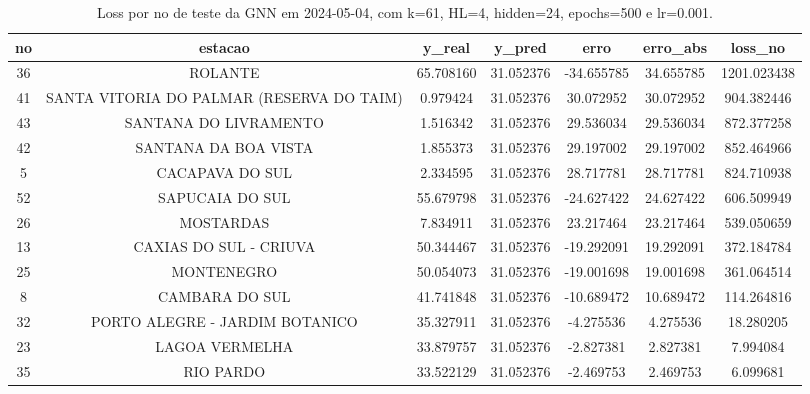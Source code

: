 \begin{table}[h]
\centering
\caption{Loss por no de teste da GNN em 2024-05-04, com k=61, HL=4, hidden=24, epochs=500 e lr=0.001.}
\label{tab:gnn_loss_k61_hl4_h24_e500_d20240504}
\begin{tabular}{ccccccc}
\toprule
no & estacao & y\_real & y\_pred & erro & erro\_abs & loss\_no \\
\midrule
36 & ROLANTE & 65.708160 & 31.052376 & -34.655785 & 34.655785 & 1201.023438 \\
41 & SANTA VITORIA DO PALMAR (RESERVA DO TAIM) & 0.979424 & 31.052376 & 30.072952 & 30.072952 & 904.382446 \\
43 & SANTANA DO LIVRAMENTO & 1.516342 & 31.052376 & 29.536034 & 29.536034 & 872.377258 \\
42 & SANTANA DA BOA VISTA & 1.855373 & 31.052376 & 29.197002 & 29.197002 & 852.464966 \\
5 & CACAPAVA DO SUL & 2.334595 & 31.052376 & 28.717781 & 28.717781 & 824.710938 \\
52 & SAPUCAIA DO SUL & 55.679798 & 31.052376 & -24.627422 & 24.627422 & 606.509949 \\
26 & MOSTARDAS & 7.834911 & 31.052376 & 23.217464 & 23.217464 & 539.050659 \\
13 & CAXIAS DO SUL - CRIUVA & 50.344467 & 31.052376 & -19.292091 & 19.292091 & 372.184784 \\
25 & MONTENEGRO & 50.054073 & 31.052376 & -19.001698 & 19.001698 & 361.064514 \\
8 & CAMBARA DO SUL & 41.741848 & 31.052376 & -10.689472 & 10.689472 & 114.264816 \\
32 & PORTO ALEGRE - JARDIM BOTANICO & 35.327911 & 31.052376 & -4.275536 & 4.275536 & 18.280205 \\
23 & LAGOA VERMELHA & 33.879757 & 31.052376 & -2.827381 & 2.827381 & 7.994084 \\
35 & RIO PARDO & 33.522129 & 31.052376 & -2.469753 & 2.469753 & 6.099681 \\
\bottomrule
\end{tabular}
\end{table}
